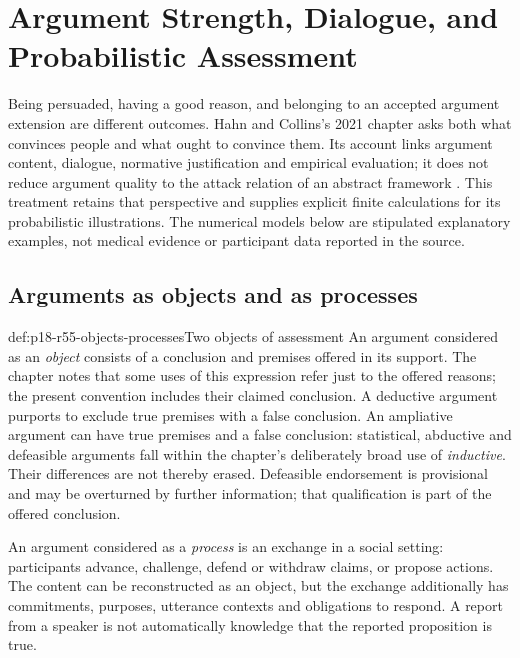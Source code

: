 \chapter{Argument Strength, Dialogue, and Probabilistic Assessment}
\label{sec:p18-rationality-5-5}

Being persuaded, having a good reason, and belonging to an accepted
argument extension are different outcomes. Hahn and Collins's 2021
chapter asks both what convinces people and what ought to convince them.
Its account links argument content, dialogue, normative justification
and empirical evaluation; it does not reduce argument quality to the
attack relation of an abstract framework
\cite[pp.~361--364]{HahnCollins2021ArgumentationTheory}.
This treatment retains that perspective and supplies explicit finite
calculations for its probabilistic illustrations. The numerical models
below are stipulated explanatory examples, not medical evidence or
participant data reported in the source.

\section{Arguments as objects and as processes}

\begin{hbdefinition}{def:p18-r55-objects-processes}{Two objects of assessment}
An argument considered as an \emph{object} consists of a conclusion
and premises offered in its support. The chapter notes that some uses
of this expression refer just to the offered reasons; the present
convention includes their claimed conclusion. A deductive argument
purports to exclude true premises with a false conclusion. An ampliative
argument can have true premises and a false conclusion: statistical,
abductive and defeasible arguments fall within the chapter's deliberately
broad use of \emph{inductive}. Their differences are not thereby erased.
Defeasible endorsement is provisional and may be overturned by further
information; that qualification is part of the offered conclusion.

An argument considered as a \emph{process} is an exchange in a social
setting: participants advance, challenge, defend or withdraw claims,
or propose actions. The content can be reconstructed as an object,
but the exchange additionally has commitments, purposes, utterance
contexts and obligations to respond. A report from a speaker is not
automatically knowledge that the reported proposition is true.
\cite[p.~361 and note~1, p.~365]{HahnCollins2021ArgumentationTheory}
\end{hbdefinition}

